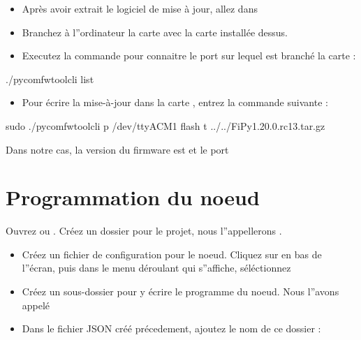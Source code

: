 \documentclass[letterpaper,10pt,french]{sphinxmanual}
\begin{document}
\begin{itemize}
\begin{itemize}
\item {} 
Après avoir extrait le logiciel de mise à jour, allez dans 

\item {} 
Branchez à l”ordinateur la carte  avec la carte  installée dessus.

\item {} 
Executez la commande pour connaitre le port sur lequel est branché la carte :

\end{itemize}

\begin{sphinxVerbatim}[commandchars=\\\{\}]
./pycom\PYGZhy{}fwtool\PYGZhy{}cli list 
\end{sphinxVerbatim}
\begin{itemize}
\item {} 
Pour écrire la mise-à-jour dans la carte , entrez la commande suivante :

\end{itemize}

\begin{sphinxVerbatim}[commandchars=\\\{\}]
sudo ./pycom\PYGZhy{}fwtool\PYGZhy{}cli \PYGZhy{}p /dev/ttyACM1 flash \PYGZhy{}t ../../FiPy\PYGZhy{}1.20.0.rc13.tar.gz
\end{sphinxVerbatim}

Dans notre cas, la version du firmware est  et le port 

\end{itemize}


\section{Programmation du noeud}
\label{\detokenize{AnnexeA:programmation-du-noeud}}
Ouvrez  ou . Créez un dossier pour le projet, nous l”appellerons .
\begin{itemize}
\item {} 
Créez un fichier de configuration pour le noeud. Cliquez sur  en bas de l”écran, puis dans le menu déroulant qui s”affiche, séléctionnez 

\item {} 
Créez un sous-dossier pour y écrire le programme du noeud. Nous l”avons appelé 

\item {} 
Dans le fichier JSON créé précedement, ajoutez le nom de ce dossier :

\end{itemize}
\end{document}
